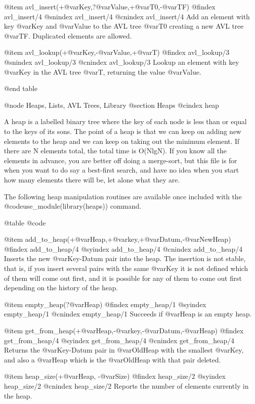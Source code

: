 {{{{{{{{@item avl_insert(+@var{Key},?@var{Value},+@var{T0},-@var{TF})
@findex avl_insert/4
@snindex avl_insert/4
@cnindex avl_insert/4
Add an element with key @var{Key} and @var{Value} to the AVL tree
@var{T0} creating a new AVL tree @var{TF}. Duplicated elements are
allowed.

@item avl_lookup(+@var{Key},-@var{Value},+@var{T})
@findex avl_lookup/3
@snindex avl_lookup/3
@cnindex avl_lookup/3
Lookup an element with key @var{Key} in the AVL tree
@var{T}, returning the value @var{Value}.

@end table

@node Heaps, Lists, AVL Trees, Library
@section Heaps
@cindex heap

A heap is a labelled binary tree where the key of each node is less than
or equal to the keys of its sons.  The point of a heap is that we can
keep on adding new elements to the heap and we can keep on taking out
the minimum element.  If there are N elements total, the total time is
O(NlgN).  If you know all the elements in advance, you are better off
doing a merge-sort, but this file is for when you want to do say a
best-first search, and have no idea when you start how many elements
there will be, let alone what they are.

The following heap manipulation routines are available once included
with the @code{use_module(library(heaps))} command. 

@table @code

@item add_to_heap(+@var{Heap},+@var{key},+@var{Datum},-@var{NewHeap})
@findex add_to_heap/4
@syindex        add_to_heap/4
@cnindex        add_to_heap/4
Inserts the new @var{Key-Datum} pair into the heap. The insertion is not
stable, that is, if you insert several pairs with the same @var{Key} it
is not defined which of them will come out first, and it is possible for
any of them to come out first depending on the  history of the heap.

@item empty_heap(?@var{Heap})
@findex empty_heap/1
@syindex        empty_heap/1
@cnindex        empty_heap/1
Succeeds if @var{Heap} is an empty heap.

@item get_from_heap(+@var{Heap},-@var{key},-@var{Datum},-@var{Heap})
@findex get_from_heap/4
@syindex        get_from_heap/4
@cnindex        get_from_heap/4
Returns the @var{Key-Datum} pair in @var{OldHeap} with the smallest
@var{Key}, and also a @var{Heap} which is the @var{OldHeap} with that
pair deleted.

@item heap_size(+@var{Heap}, -@var{Size})
@findex heap_size/2
@syindex        heap_size/2
@cnindex        heap_size/2
Reports the number of elements currently in the heap.

}}}}}}}}
